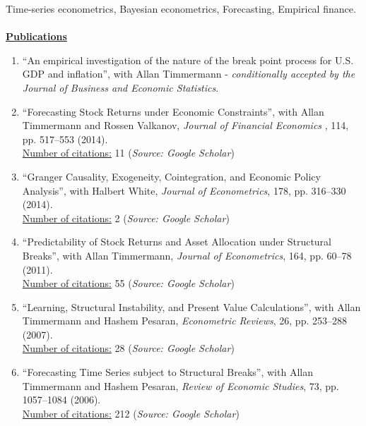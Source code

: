 \documentclass[12pt]{article}
\begin{document}
Time-series econometrics, Bayesian econometrics, Forecasting, Empirical finance.\\ \\
\underline{\textbf{Publications}}
\begin{enumerate}	
  \item ``An empirical investigation of the nature of the break point process for U.S. GDP and inflation'', with Allan Timmermann  - \textit{conditionally accepted by the} \emph{Journal of Business and Economic Statistics}.
	
	\item ``Forecasting Stock Returns under Economic Constraints'', with Allan Timmermann and Rossen Valkanov, \emph{Journal of Financial Economics} , 114, pp. 517--553 (2014). \\
	\underline{Number of citations:} 11 (\emph{Source: Google Scholar})
	
	\item ``Granger Causality, Exogeneity, Cointegration, and Economic Policy Analysis'', with Halbert White, \emph{Journal of Econometrics}, 178, pp. 316--330 (2014). \\
	\underline{Number of citations:} 2 (\emph{Source: Google Scholar})
	
	\item ``Predictability of Stock Returns and Asset Allocation under Structural Breaks'', with Allan Timmermann, \emph{Journal of Econometrics}, 164, pp. 60--78 (2011). \\
	\underline{Number of citations:} 55 (\emph{Source: Google Scholar})
	
	\item ``Learning, Structural Instability, and Present Value Calculations'', with Allan Timmermann and Hashem Pesaran, \emph{Econometric Reviews}, 26, pp. 253--288 (2007). \\
	\underline{Number of citations:} 28 (\emph{Source: Google Scholar})

	\item ``Forecasting Time Series subject to Structural Breaks'', with Allan Timmermann and Hashem Pesaran, \emph{Review of Economic Studies}, 73, pp. 1057--1084 (2006). \\
	\underline{Number of citations:} 212 (\emph{Source: Google Scholar})

    \setcounter{enumTemp}{\theenumi}
 \end{enumerate}
\end{document}
